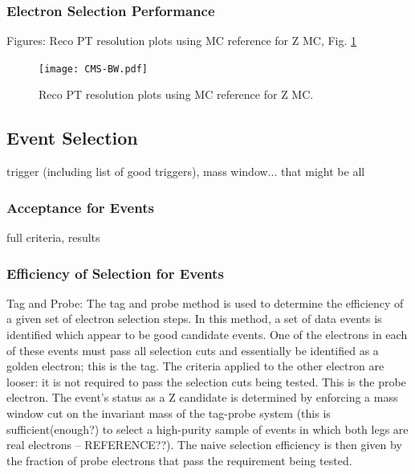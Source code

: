 \subsubsection{Electron Selection Performance} %
Figures: Reco PT resolution plots using MC reference for Z MC, Fig. \ref{fig:RecoPtResolution}

 \begin{figure}[htb]
  \begin{center}
    \texttt{[image: CMS-BW.pdf]}
  \end{center}
  \caption[Reco PT resolution plots using MC reference for Z MC]{Reco PT resolution plots using MC reference for Z MC.}
  \label{fig:RecoPtResolution}
 \end{figure}


\subsection{\Zee Event Selection}
\label{evSel:zee}
trigger (including list of good triggers), mass window... that might be all

\subsubsection{Acceptance for \Zee Events}
\label{evSel:acc}
full criteria, results

\subsubsection{Efficiency of Selection for \Zee Events}
\label{evSel:eff}
Tag and Probe:  The tag and probe method is used to determine the efficiency of a given set of electron selection steps.  
In this method, a set of data events is identified which appear to be good 
\Zee
candidate events.  
One of the electrons in each of these events must pass 
all selection cuts and essentially be identified as a golden electron; 
this is the tag.  
The criteria applied to the other electron are looser: it is not required to pass the selection cuts being tested.  
This is the probe electron.  
The event's status as a Z candidate is determined by enforcing a mass window cut on the invariant mass of the tag-probe system 
(this is sufficient(enough?) to select a high-purity sample of events in which both legs are real electrons -- REFERENCE??).  
The naive selection efficiency is then given by the fraction of probe electrons that pass the requirement being tested.  

